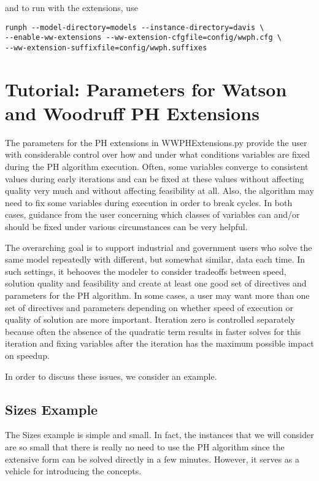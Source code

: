 and to run with the extensions, use

\begin{verbatim}
runph --model-directory=models --instance-directory=davis \
--enable-ww-extensions --ww-extension-cfgfile=config/wwph.cfg \
--ww-extension-suffixfile=config/wwph.suffixes
\end{verbatim}


\section{Tutorial: Parameters for Watson and Woodruff PH Extensions
\label{WWTutorialSec}}

The parameters for the PH extensions in WWPHExtensions.py provide the user with
considerable control over how and under what conditions variables are fixed
during the PH algorithm execution. Often, some variables converge to consistent
values during early iterations and can be fixed at these values without
affecting quality very much and without affecting feasibility at all. Also, the
algorithm may need to fix some variables during execution in order to break
cycles. In both cases, guidance from the user concerning which classes of
variables can and/or should be fixed under various circumstances can be very
helpful.

The overarching goal is to support industrial and government users who solve the
same model repeatedly with different, but somewhat similar, data each time. In
such settings, it behooves the modeler to consider tradeoffs between speed,
solution quality and feasibility and create at least one good set of directives
and parameters for the PH algorithm. In some cases, a user may want more than
one set of directives and parameters depending on whether speed of execution or
quality of solution are more important. Iteration zero is controlled separately
because often the absence of the quadratic term results in faster solves for
this iteration and fixing variables after the iteration has the maximum possible
impact on speedup.

In order to discuss these issues, we consider an example.

\subsection{Sizes Example}

The Sizes example is simple and small. In fact, the instances that we will
consider are so small that there is really no need to use the PH algorithm since
the extensive form can be solved directly in a few minutes. However, it serves
as a vehicle for introducing the concepts.

